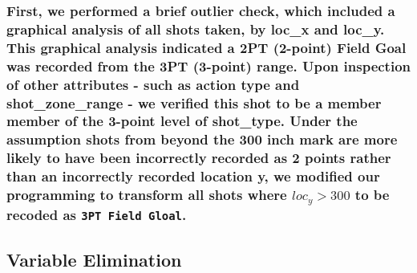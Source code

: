 \documentclass[american,]{article}
\begin{document}
{\subsubsection{\texorpdfstring{First, we performed a brief outlier check, which included a graphical analysis of all shots taken, by loc\_x and loc\_y. This graphical analysis indicated a 2PT (2-point) Field Goal was recorded from the 3PT (3-point) range. Upon inspection of other attributes - such as action type and shot\_zone\_range - we verified this shot to be a member member of the 3-point level of shot\_type. Under the assumption shots from beyond the 300 inch mark are more likely to have been incorrectly recorded as 2 points rather than an incorrectly recorded location y, we modified our programming to transform all shots where \(loc_y > 300\) to be recoded as \texttt{3PT\ Field\ Gloal}.}{First, we performed a brief outlier check, which included a graphical analysis of all shots taken, by loc\_x and loc\_y. This graphical analysis indicated a 2PT (2-point) Field Goal was recorded from the 3PT (3-point) range. Upon inspection of other attributes - such as action type and shot\_zone\_range - we verified this shot to be a member member of the 3-point level of shot\_type. Under the assumption shots from beyond the 300 inch mark are more likely to have been incorrectly recorded as 2 points rather than an incorrectly recorded location y, we modified our programming to transform all shots where loc\_y \textgreater{} 300 to be recoded as 3PT Field Gloal.}}\label{first-we-performed-a-brief-outlier-check-which-included-a-graphical-analysis-of-all-shots-taken-by-loc_x-and-loc_y.-this-graphical-analysis-indicated-a-2pt-2-point-field-goal-was-recorded-from-the-3pt-3-point-range.-upon-inspection-of-other-attributes---such-as-action-type-and-shot_zone_range---we-verified-this-shot-to-be-a-member-member-of-the-3-point-level-of-shot_type.-under-the-assumption-shots-from-beyond-the-300-inch-mark-are-more-likely-to-have-been-incorrectly-recorded-as-2-points-rather-than-an-incorrectly-recorded-location-y-we-modified-our-programming-to-transform-all-shots-where-loc_y-300-to-be-recoded-as-3pt-field-gloal.}}

\hypertarget{variable-elimination}{%
\subsection{\texorpdfstring{\textbf{Variable Elimination}}{Variable Elimination}}\label{variable-elimination}}
\end{document}
